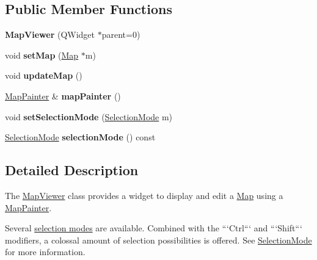 \subsection*{\-Public \-Member \-Functions}
\begin{DoxyCompactItemize}
\item 
\hypertarget{class_map_viewer_ae2c78c6e6ac686b2db1f4b3a7e3f318a}{{\bfseries \-Map\-Viewer} (\-Q\-Widget $\ast$parent=0)}\label{class_map_viewer_ae2c78c6e6ac686b2db1f4b3a7e3f318a}

\item 
\hypertarget{class_map_viewer_a15df9bdd47e5ad36c67601d335bfa5f1}{void {\bfseries set\-Map} (\hyperlink{class_map}{\-Map} $\ast$m)}\label{class_map_viewer_a15df9bdd47e5ad36c67601d335bfa5f1}

\item 
\hypertarget{class_map_viewer_a723ad37abb7af9ecac0bdd68dd628e46}{void {\bfseries update\-Map} ()}\label{class_map_viewer_a723ad37abb7af9ecac0bdd68dd628e46}

\item 
\hypertarget{class_map_viewer_af30594b6df0ea90676a4dc4ec65abaca}{\hyperlink{class_map_painter}{\-Map\-Painter} \& {\bfseries map\-Painter} ()}\label{class_map_viewer_af30594b6df0ea90676a4dc4ec65abaca}

\item 
\hypertarget{class_map_viewer_ad4ef828182ead076c00d48827e401b5d}{void {\bfseries set\-Selection\-Mode} (\hyperlink{class_map_viewer_a8a7a365452e5770c1fab21a9bfb0067d}{\-Selection\-Mode} m)}\label{class_map_viewer_ad4ef828182ead076c00d48827e401b5d}

\item 
\hypertarget{class_map_viewer_a923bddd563c6e0078a30e8f9ea9971e8}{\hyperlink{class_map_viewer_a8a7a365452e5770c1fab21a9bfb0067d}{\-Selection\-Mode} {\bfseries selection\-Mode} () const }\label{class_map_viewer_a923bddd563c6e0078a30e8f9ea9971e8}

\end{DoxyCompactItemize}


\subsection{\-Detailed \-Description}
\-The \hyperlink{class_map_viewer}{\-Map\-Viewer} class provides a widget to display and edit a \hyperlink{class_map}{\-Map} using a \hyperlink{class_map_painter}{\-Map\-Painter}. 

\-Several \hyperlink{class_map_viewer_a8a7a365452e5770c1fab21a9bfb0067d}{selection modes} are available. \-Combined with the ```\-Ctrl``` and ```\-Shift``` modifiers, a colossal amount of selection possibilities is offered. \-See \hyperlink{class_map_viewer_a8a7a365452e5770c1fab21a9bfb0067d}{\-Selection\-Mode} for more information. 

